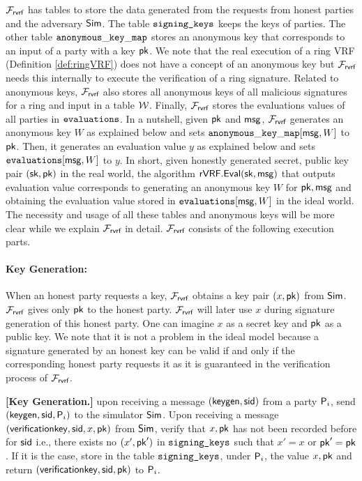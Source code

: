 $ \mathcal{F}_{\textsf{rvrf}} $ has tables to store the data generated from the requests from honest parties and the adversary $ \mathsf{Sim} $. The table $ \texttt{signing\_keys} $  keeps the keys of parties. The other table  $ \mathtt{anonymous\_key\_map} $ stores an anonymous key that corresponds to an input  of a party with a key $ \mathsf{pk} $. We note that the real execution of a ring VRF (Definition \ref{def:ringVRF}) does not have a concept of an anonymous key but $ \mathcal{F}_{\textsf{rvrf}} $ needs this internally to execute the verification of a ring signature. Related to anonymous keys, $ \mathcal{F}_{\textsf{rvrf}} $ also stores  all  anonymous keys of all malicious  signatures  for a ring and input in a table $ \mathcal{W} $. Finally, $ \mathcal{F}_{\textsf{rvrf}} $ stores the evaluations values of all parties in $ \texttt{evaluations} $. In a nutshell,  given $ \mathsf{pk} $
and $ \mathsf{msg} $, $ \mathcal{F}_{\textsf{rvrf}} $  generates an anonymous key $ W $ as explained below and  sets $ \mathtt{anonymous\_key\_map}[\mathsf{msg},W]  $ to $ \mathsf{pk} $. Then, it generates an evaluation value $ y $ as explained below and sets $ \texttt{evaluations}[\mathsf{msg},W]  $ to $ y $. In short, given honestly generated secret, public key pair $ (\mathsf{sk},\mathsf{pk}) $ in the real world, the algorithm
$ {\mathsf{rVRF}}.{\mathsf{Eval}}(\mathsf{sk},\mathsf{msg}) $  that outputs evaluation value corresponds to generating an anonymous key $ W $ for $ \mathsf{pk}, \mathsf{msg} $ and obtaining the evaluation value stored in $ \texttt{evaluations}[\mathsf{msg},W] $ in the ideal world. The necessity and usage of all these tables and anonymous keys will be more clear while we explain $ \mathcal{F}_{\textsf{rvrf}} $ in detail. $ \mathcal{F}_{\textsf{rvrf}} $ consists of the following execution parts.



\paragraph{Key Generation:}  When an honest party requests  a key, $ \mathcal{F}_{\textsf{rvrf}} $ obtains a key pair $ (x, \mathsf{pk}) $ from $ \mathsf{Sim} $. $ \mathcal{F}_{\textsf{rvrf}} $ gives only $ \mathsf{pk} $ to the honest party. $ \mathcal{F}_{\textsf{rvrf}} $ will later use $ x $ during signature generation of this honest party. One can imagine $ x $ as a secret key and $ \mathsf{pk} $ as a public key. We note that it is not a problem in the ideal model  because a signature generated by an honest key can be valid if and only if the corresponding honest party requests it as it is guaranteed in the verification process of $ \mathcal{F}_{\textsf{rvrf}} $.

\begin{tcolorbox}[left=2pt,right=2pt]
	\eprint{}{\scriptsize}
	\textbf{[Key Generation.]} upon receiving a message $(\mathsf{keygen}, \textsf{sid})$ from a party $\mathsf{P}_i$, send $(\mathsf{keygen}, \textsf{sid}, \mathsf{P}_i)$ to the simulator $\mathsf{Sim}$.
	Upon receiving a message $(\mathsf{verificationkey}, \textsf{sid}, x,\mathsf{pk})$ from $\mathsf{Sim}$, verify that $x,\mathsf{pk}$ has not been recorded before for $ \textsf{sid} $ i.e., there exists no $ (x', \mathsf{pk}') $ in $ \texttt{signing\_keys} $ such that $ x' = x $ or $ \mathsf{pk}' = \mathsf{pk} $. If it is the case, store in the table $\texttt{signing\_keys}$, under $\mathsf{P}_i$, the value $x,\mathsf{pk}$ and return $(\mathsf{verificationkey}, \textsf{sid}, \mathsf{pk})$ to $ \mathsf{P}_i$.
\end{tcolorbox}

